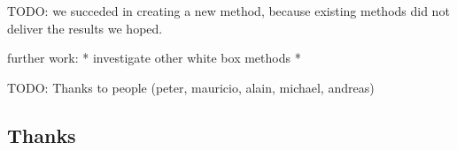 TODO: we succeded in creating a new method, because existing methods did not deliver the results we hoped.

further work:
* investigate other white box methods
* 

TODO: Thanks to people (peter, mauricio, alain, michael, andreas)

\subsection{Thanks}
